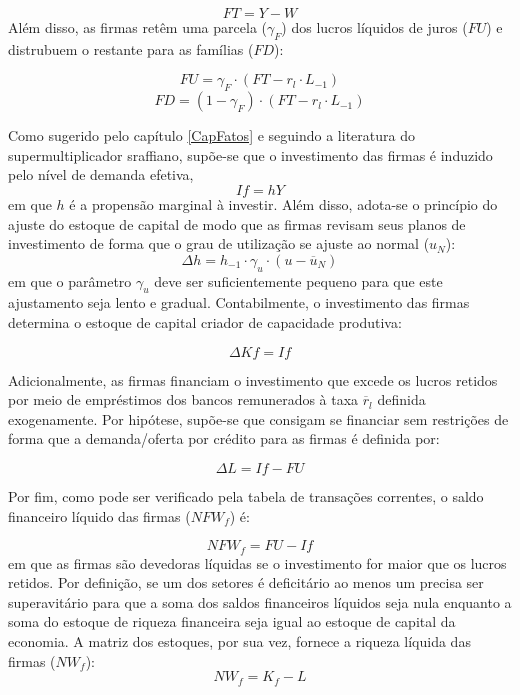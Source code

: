 \begin{equation}
    FT = Y - W
\end{equation}
Além disso, as firmas retêm uma parcela ($\gamma_F$) dos lucros líquidos de juros ($FU$) e distrubuem o restante para as famílias ($FD$):

\begin{equation}
    FU = \gamma_F\cdot (FT - r_l\cdot L_{-1})
\end{equation}
\begin{equation}
    FD = (1-\gamma_F)\cdot (FT - r_l\cdot L_{-1})
\end{equation}

Como sugerido pelo capítulo \ref{CapFatos} e seguindo a literatura do supermultiplicador sraffiano, supõe-se que o investimento das firmas é induzido pelo nível de demanda efetiva,
\begin{equation}
\label{_If}
    If = hY
\end{equation}
em que $h$ é a propensão marginal à investir. Além disso, adota-se o princípio do ajuste do estoque de capital de modo que as firmas revisam seus planos de investimento de forma que o grau de utilização se ajuste ao normal ($u_N$):
\begin{equation}
\label{_h}
    \Delta h = h_{-1}\cdot \gamma_u\cdot (u - \overline{u}_N)
\end{equation}
em que o parâmetro $\gamma_u$ deve ser suficientemente pequeno para que este ajustamento seja lento e gradual. Contabilmente, o investimento das firmas determina o estoque de capital criador de capacidade produtiva:

\begin{equation}
    \Delta Kf = If
\end{equation}

Adicionalmente, as firmas financiam o investimento que excede os lucros retidos por meio de empréstimos dos bancos remunerados à taxa $\overline r_l$ definida exogenamente. Por hipótese, supõe-se que consigam se financiar sem restrições de forma que a demanda/oferta por crédito para as firmas é definida por:

\begin{equation}
    \Delta L = If - FU
\end{equation}

Por fim, como pode ser verificado pela tabela de transações correntes, o saldo financeiro líquido das firmas ($NFW_f$) é:

\begin{equation}
    NFW_f = FU - If
\end{equation}
em que as firmas são devedoras líquidas se o investimento for maior que os lucros retidos. Por definição, se um dos setores é deficitário ao menos um precisa ser superavitário para que a soma dos saldos financeiros líquidos seja nula enquanto a soma do estoque de riqueza financeira seja igual ao estoque de capital da economia. A matriz dos estoques, por sua vez, fornece a riqueza líquida das firmas ($NW_f$):
\begin{equation}
    NW_f = K_f - L
\end{equation}

